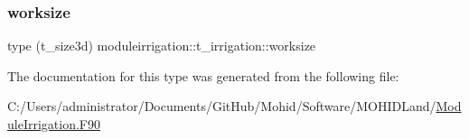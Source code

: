 \subsubsection{\texorpdfstring{worksize}{worksize}}
{\footnotesize\ttfamily type (t\+\_\+size3d) moduleirrigation\+::t\+\_\+irrigation\+::worksize\hspace{0.3cm}{\ttfamily [private]}}



The documentation for this type was generated from the following file\+:\begin{DoxyCompactItemize}
\item 
C\+:/\+Users/administrator/\+Documents/\+Git\+Hub/\+Mohid/\+Software/\+M\+O\+H\+I\+D\+Land/\mbox{\hyperlink{_module_irrigation_8_f90}{Module\+Irrigation.\+F90}}\end{DoxyCompactItemize}
